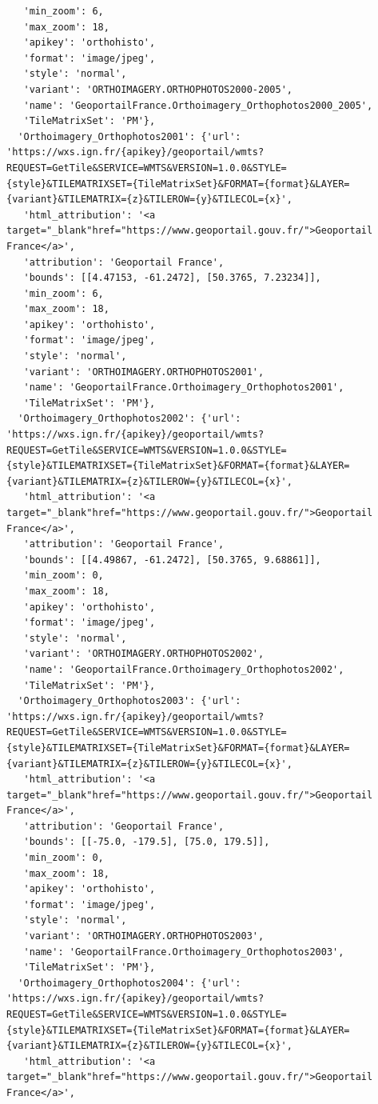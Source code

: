 \documentclass[
  letterpaper,
  DIV=11,
  numbers=noendperiod]{scrreprt}
\begin{document}
\begin{verbatim}
   'min_zoom': 6,
   'max_zoom': 18,
   'apikey': 'orthohisto',
   'format': 'image/jpeg',
   'style': 'normal',
   'variant': 'ORTHOIMAGERY.ORTHOPHOTOS2000-2005',
   'name': 'GeoportailFrance.Orthoimagery_Orthophotos2000_2005',
   'TileMatrixSet': 'PM'},
  'Orthoimagery_Orthophotos2001': {'url': 'https://wxs.ign.fr/{apikey}/geoportail/wmts?REQUEST=GetTile&SERVICE=WMTS&VERSION=1.0.0&STYLE={style}&TILEMATRIXSET={TileMatrixSet}&FORMAT={format}&LAYER={variant}&TILEMATRIX={z}&TILEROW={y}&TILECOL={x}',
   'html_attribution': '<a target="_blank"href="https://www.geoportail.gouv.fr/">Geoportail France</a>',
   'attribution': 'Geoportail France',
   'bounds': [[4.47153, -61.2472], [50.3765, 7.23234]],
   'min_zoom': 6,
   'max_zoom': 18,
   'apikey': 'orthohisto',
   'format': 'image/jpeg',
   'style': 'normal',
   'variant': 'ORTHOIMAGERY.ORTHOPHOTOS2001',
   'name': 'GeoportailFrance.Orthoimagery_Orthophotos2001',
   'TileMatrixSet': 'PM'},
  'Orthoimagery_Orthophotos2002': {'url': 'https://wxs.ign.fr/{apikey}/geoportail/wmts?REQUEST=GetTile&SERVICE=WMTS&VERSION=1.0.0&STYLE={style}&TILEMATRIXSET={TileMatrixSet}&FORMAT={format}&LAYER={variant}&TILEMATRIX={z}&TILEROW={y}&TILECOL={x}',
   'html_attribution': '<a target="_blank"href="https://www.geoportail.gouv.fr/">Geoportail France</a>',
   'attribution': 'Geoportail France',
   'bounds': [[4.49867, -61.2472], [50.3765, 9.68861]],
   'min_zoom': 0,
   'max_zoom': 18,
   'apikey': 'orthohisto',
   'format': 'image/jpeg',
   'style': 'normal',
   'variant': 'ORTHOIMAGERY.ORTHOPHOTOS2002',
   'name': 'GeoportailFrance.Orthoimagery_Orthophotos2002',
   'TileMatrixSet': 'PM'},
  'Orthoimagery_Orthophotos2003': {'url': 'https://wxs.ign.fr/{apikey}/geoportail/wmts?REQUEST=GetTile&SERVICE=WMTS&VERSION=1.0.0&STYLE={style}&TILEMATRIXSET={TileMatrixSet}&FORMAT={format}&LAYER={variant}&TILEMATRIX={z}&TILEROW={y}&TILECOL={x}',
   'html_attribution': '<a target="_blank"href="https://www.geoportail.gouv.fr/">Geoportail France</a>',
   'attribution': 'Geoportail France',
   'bounds': [[-75.0, -179.5], [75.0, 179.5]],
   'min_zoom': 0,
   'max_zoom': 18,
   'apikey': 'orthohisto',
   'format': 'image/jpeg',
   'style': 'normal',
   'variant': 'ORTHOIMAGERY.ORTHOPHOTOS2003',
   'name': 'GeoportailFrance.Orthoimagery_Orthophotos2003',
   'TileMatrixSet': 'PM'},
  'Orthoimagery_Orthophotos2004': {'url': 'https://wxs.ign.fr/{apikey}/geoportail/wmts?REQUEST=GetTile&SERVICE=WMTS&VERSION=1.0.0&STYLE={style}&TILEMATRIXSET={TileMatrixSet}&FORMAT={format}&LAYER={variant}&TILEMATRIX={z}&TILEROW={y}&TILECOL={x}',
   'html_attribution': '<a target="_blank"href="https://www.geoportail.gouv.fr/">Geoportail France</a>',

\end{verbatim}
\end{document}
